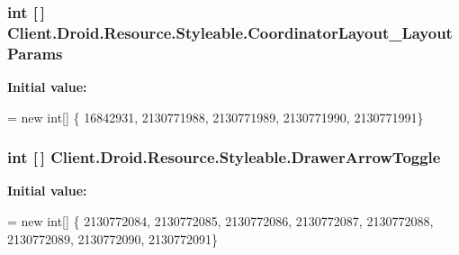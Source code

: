 \subsubsection[{Coordinator\+Layout\+\_\+\+Layout\+Params}]{\setlength{\rightskip}{0pt plus 5cm}int \mbox{[}$\,$\mbox{]} Client.\+Droid.\+Resource.\+Styleable.\+Coordinator\+Layout\+\_\+\+Layout\+Params\hspace{0.3cm}{\ttfamily [static]}}\label{classClient_1_1Droid_1_1Resource_1_1Styleable_a40093e0639053736adca43c4abe2c339}
{\bfseries Initial value\+:}
\begin{DoxyCode}
= \textcolor{keyword}{new} \textcolor{keywordtype}{int}[]
            \{
                    16842931,
                    2130771988,
                    2130771989,
                    2130771990,
                    2130771991\}
\end{DoxyCode}
\hypertarget{classClient_1_1Droid_1_1Resource_1_1Styleable_a99c1a5f04554f9b9882a112098a6a5b0}{}
\subsubsection[{Drawer\+Arrow\+Toggle}]{\setlength{\rightskip}{0pt plus 5cm}int \mbox{[}$\,$\mbox{]} Client.\+Droid.\+Resource.\+Styleable.\+Drawer\+Arrow\+Toggle\hspace{0.3cm}{\ttfamily [static]}}\label{classClient_1_1Droid_1_1Resource_1_1Styleable_a99c1a5f04554f9b9882a112098a6a5b0}
{\bfseries Initial value\+:}
\begin{DoxyCode}
= \textcolor{keyword}{new} \textcolor{keywordtype}{int}[]
            \{
                    2130772084,
                    2130772085,
                    2130772086,
                    2130772087,
                    2130772088,
                    2130772089,
                    2130772090,
                    2130772091\}
\end{DoxyCode}
\hypertarget{classClient_1_1Droid_1_1Resource_1_1Styleable_a9dd3d022980fad88f04bdeb5bc0d4114}{}
